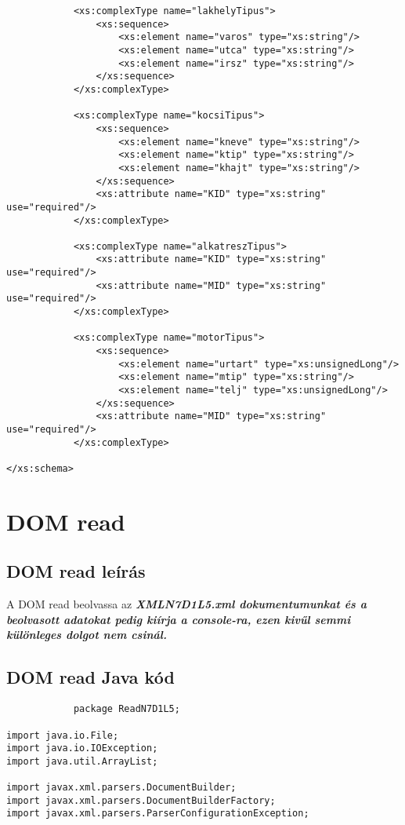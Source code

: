 \documentclass[14pt]{extarticle}
\begin{document}
\begin{normalsize}
\begin{verbatim}
			<xs:complexType name="lakhelyTipus">
				<xs:sequence>
					<xs:element name="varos" type="xs:string"/>
					<xs:element name="utca" type="xs:string"/>
					<xs:element name="irsz" type="xs:string"/>
				</xs:sequence>
			</xs:complexType>
			
			<xs:complexType name="kocsiTipus">
				<xs:sequence>
					<xs:element name="kneve" type="xs:string"/>
					<xs:element name="ktip" type="xs:string"/>
					<xs:element name="khajt" type="xs:string"/>		
				</xs:sequence>
				<xs:attribute name="KID" type="xs:string" use="required"/> 
			</xs:complexType>

            <xs:complexType name="alkatreszTipus">
				<xs:attribute name="KID" type="xs:string" use="required"/> 
				<xs:attribute name="MID" type="xs:string" use="required"/>
			</xs:complexType>
			
			<xs:complexType name="motorTipus">
				<xs:sequence>
					<xs:element name="urtart" type="xs:unsignedLong"/>
					<xs:element name="mtip" type="xs:string"/>
                    <xs:element name="telj" type="xs:unsignedLong"/>
				</xs:sequence>
                <xs:attribute name="MID" type="xs:string" use="required"/>
			</xs:complexType>
			
</xs:schema>
		\end{verbatim}
		\section{DOM read}
		\subsection{DOM read leírás}
		\begin{normalsize}
			A DOM read beolvassa az \bfseries\itshape XMLN7D1L5.xml \mdseries\upshape dokumentumunkat és a beolvasott adatokat pedig kiírja a console-ra, ezen kivűl semmi különleges dolgot nem csinál.
		\end{normalsize}
		\subsection{DOM read Java kód}
		\small
		\begin{verbatim}
			package ReadN7D1L5;

import java.io.File;
import java.io.IOException;
import java.util.ArrayList;

import javax.xml.parsers.DocumentBuilder;
import javax.xml.parsers.DocumentBuilderFactory;
import javax.xml.parsers.ParserConfigurationException;


\end{verbatim}
\end{normalsize}
\end{document}
